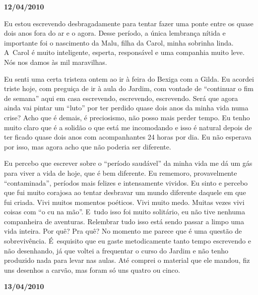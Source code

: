 \begin{center}\asterisc{}\end{center}
 \begin{flushright}\textbf{12/04/2010}\end{flushright}


Eu estou escrevendo desbragadamente para tentar fazer uma ponte entre os
quase dois anos fora do ar e o agora. Desse período, a única lembrança
nítida e importante foi o nascimento da Malu, filha da Carol, minha
sobrinha linda. A~Carol é muito inteligente, esperta, responsável e uma
companhia muito leve. Nós nos damos às mil maravilhas.

Eu senti uma certa tristeza ontem ao ir à feira do Bexiga com a Gilda.
Eu acordei triste hoje, com preguiça de ir à aula do Jardim, com vontade
de ``continuar o fim de semana'' aqui em casa escrevendo, escrevendo,
escrevendo. Será que agora ainda vai pintar um ``luto'' por ter perdido
quase dois anos da minha vida numa crise? Acho que é demais, é
preciosismo, não posso mais perder tempo. Eu tenho muito claro que é a
solidão o que está me incomodando e isso é natural depois de ter ficado
quase dois anos com acompanhantes 24 horas por dia. Eu não esperava por
isso, mas agora acho que não poderia ser diferente.

Eu percebo que escrever sobre o ``período saudável'' da minha vida me dá
um gás para viver a vida de hoje, que é bem diferente. Eu rememoro,
provavelmente ``contaminada'', períodos mais felizes e intensamente
vividos. Eu sinto e percebo que fui muito corajosa ao tentar desbravar
um mundo diferente daquele em que fui criada. Vivi muitos momentos
poéticos. Vivi muito medo. Muitas vezes vivi coisas com ``o cu na mão''.
E~tudo isso foi muito solitário, eu não tive nenhuma companheira de
aventuras. Relembrar tudo isso está sendo passar a limpo uma vida
inteira. Por quê? Pra quê? No momento me parece que é uma questão de
sobrevivência. É~esquisito que eu gaste metodicamente tanto tempo
escrevendo e não desenhando, já que voltei a frequentar o curso do
Jardim e não tenho produzido nada para levar nas aulas. Até comprei o
material que ele mandou, fiz uns desenhos a carvão, mas foram só uns
quatro ou cinco.

\begin{center}\asterisc{}\end{center}
 \begin{flushright}\textbf{13/04/2010}\end{flushright}


